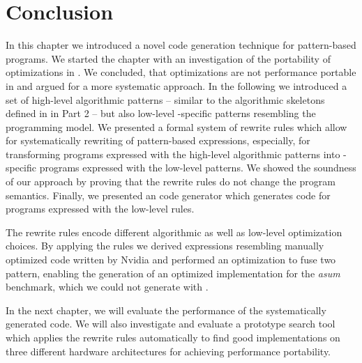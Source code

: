 \newpage











\section{Conclusion}
In this chapter we introduced a novel code generation technique for pattern-based programs.
We started the chapter with an investigation of the portability of optimizations in \OpenCL.
We concluded, that optimizations are not performance portable in \OpenCL and argued for a more systematic approach.
In the following we introduced a set of high-level algorithmic patterns -- similar to the algorithmic skeletons defined in \SkelCL in Part 2 -- but also low-level \OpenCL-specific patterns resembling the \OpenCL programming model.
We presented a formal system of rewrite rules which allow for systematically rewriting of pattern-based expressions, especially, for transforming programs expressed with the high-level algorithmic patterns into \OpenCL-specific programs expressed with the low-level patterns.
We showed the soundness of our approach by proving that the rewrite rules do not change the program semantics.
Finally, we presented an \OpenCL code generator which generates \OpenCL code for programs expressed with the low-level rules.

The rewrite rules encode different algorithmic as well as low-level optimization choices.
By applying the rules we derived expressions resembling manually optimized \OpenCL code written by Nvidia and performed an optimization to fuse two pattern, enabling the generation of an optimized implementation for the \emph{asum} benchmark, which we could not generate with \SkelCL.

In the next chapter, we will evaluate the performance of the systematically generated \OpenCL code.
We will also investigate and evaluate a prototype search tool which applies the rewrite rules automatically to find good implementations on three different hardware architectures for achieving performance portability.

